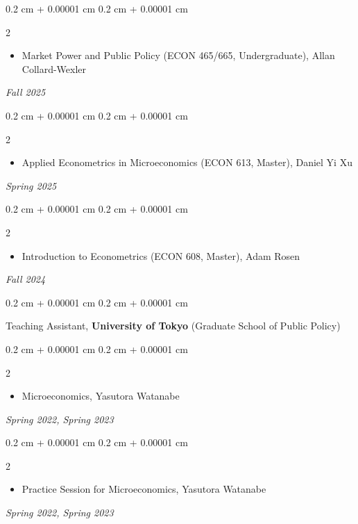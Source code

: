 \documentclass[11pt, letterpaper]{article}
\newenvironment{highlights}{
    \begin{itemize}[
        topsep=0.10 cm,
        parsep=0.10 cm,
        partopsep=0pt,
        itemsep=0pt,
        leftmargin=0.4 cm + 10pt
    ]
}{
    \end{itemize}
} %
\newenvironment{onecolentry}{
    \begin{adjustwidth}{
        0.2 cm + 0.00001 cm
    }{
        0.2 cm + 0.00001 cm
    }
}{
    \end{adjustwidth}
} %
\newenvironment{twocolentry}[2][]{
    \onecolentry
    \def\secondColumn{#2}
    \setcolumnwidth{\fill, 4.5 cm}
    \begin{paracol}{2}
}{
    \switchcolumn \raggedleft \secondColumn
    \end{paracol}
    \endonecolentry
} %
\begin{document}
    \begin{twocolentry}{
        \textit{Fall 2025}
   }
   \begin{highlights}
   \item Market Power and Public Policy (ECON 465/665, Undergraduate), Allan Collard-Wexler
   \end{highlights}
\end{twocolentry}
\vspace{0.1cm}
    \begin{twocolentry}{
             \textit{Spring 2025}
        }
        \begin{highlights}
        \item Applied Econometrics in Microeconomics (ECON 613, Master), Daniel Yi Xu
        \end{highlights}
    \end{twocolentry}
    \vspace{0.1cm}
    \begin{twocolentry}{
            \textit{Fall 2024}
        }
        \begin{highlights}
        \item Introduction to Econometrics (ECON 608, Master), Adam Rosen
        \end{highlights}
    \end{twocolentry}
    \vspace{0.2cm}

    \begin{onecolentry}
        Teaching Assistant, \textbf{University of Tokyo} (Graduate School of Public Policy) 
    \end{onecolentry}
    \vspace{0.1cm}

    
    \begin{twocolentry}{
            \textit{Spring 2022, Spring 2023}
        }
            
        \begin{highlights}
        \item Microeconomics, Yasutora Watanabe
        \end{highlights}
    \end{twocolentry}
    \vspace{0.1cm}
    
    \begin{twocolentry}{
            \textit{Spring 2022, Spring 2023}
        }
            
        \begin{highlights}
        \item Practice Session for Microeconomics, Yasutora Watanabe
        \end{highlights}
    \end{twocolentry}
        \vspace{0.2cm}
        
\end{document}
